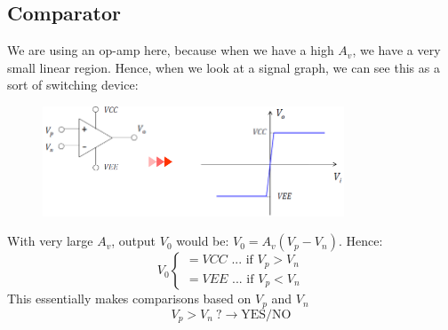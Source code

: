 \documentclass[class=report, crop=false, 12pt,a4paper]{standalone}
\begin{document}
\subsection{Comparator}
We are using an op-amp here, because when we have a high $A_v$, we have a very small linear region. Hence, when we look at a signal graph, we can see this as a sort of switching device:
\begin{figure}[H]
  \centering
  \includegraphics[width = 0.8\textwidth]{../img/diagram55.png}
\end{figure}
With very large $A_v$, output $V_0$ would be: $V_0 = A_v (V_p - V_n)$. Hence:
\begin{equation}
  V_0 \begin{cases}
    = VCC \textrm{ ... if } V_p > V_n\\
    = VEE \textrm{ ... if } V_p < V_n
  \end{cases}
\end{equation}
This essentially makes comparisons based on $V_p$ and $V_n$
\begin{equation}
  V_p > V_n \ ? \rightarrow \textrm{YES/NO}
\end{equation}
\end{document}
